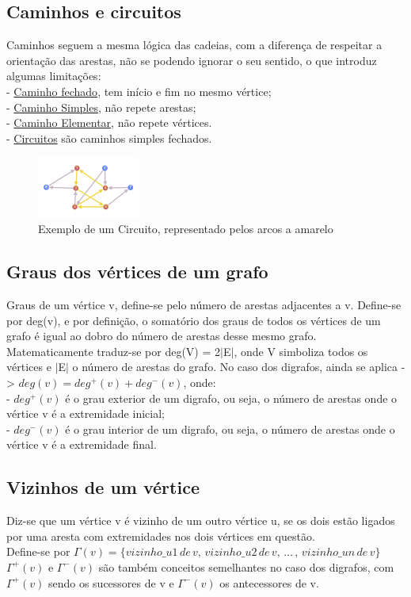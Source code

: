 \subsection{Caminhos e circuitos}
Caminhos seguem a mesma lógica das cadeias, com a diferença de respeitar a orientação das arestas, não 
se podendo ignorar o seu sentido, o que introduz algumas limitações:\\
\indent - \underline{Caminho fechado}, tem início e fim no mesmo vértice;\\
\indent - \underline{Caminho Simples}, não repete arestas;\\
\indent - \underline{Caminho Elementar}, não repete vértices.\\
\indent - \underline{Circuitos} são caminhos simples fechados.\\

\begin{figure}[h]
    \centering
    \includegraphics[width=0.3\textwidth]{imgs/Figura10}
    \caption{Exemplo de um Circuito, representado pelos arcos a amarelo
    \label{fig:imagem10}}
\end{figure}

\subsection{Graus dos vértices de um grafo}
Graus de um vértice v, define-se pelo número de arestas adjacentes a v. Define-se por deg(v), e por 
definição, o somatório dos graus de todos os vértices de um grafo é igual ao dobro do número de arestas 
desse mesmo grafo.\\
\indent Matematicamente traduz-se por  deg(V) = 2$\vert$E$\vert$, onde V simboliza todos os vértices e $\vert$E$\vert$ o número de 
arestas do grafo. No caso dos digrafos, ainda se aplica -> $deg(v) = deg^+(v) + deg^-(v)$, onde:\\
\indent - $deg^+(v)$ é o grau exterior de um digrafo, ou seja, o número de arestas onde o vértice v é a extremidade 
inicial;\\
\indent - $deg^-(v)$ é o grau interior de um digrafo, ou seja, o número de arestas onde o vértice v é a extremidade 
final.

\subsection{ Vizinhos de um vértice}
Diz-se que um vértice v é vizinho de um outro vértice u, se os dois estão ligados por uma aresta com 
extremidades nos dois vértices em questão.\\
\indent Define-se por $\Gamma(v)= \{ vizinho\_u1\,de\,v,\,vizinho\_u2\,de\,v,\,…\,,\,vizinho\_un\,de\,v \}$\\

$\Gamma^+(v)$ e $\Gamma^-(v)$ são também conceitos semelhantes no caso dos digrafos, com $\Gamma^+(v)$ sendo os sucessores de v e $\Gamma^-(v)$ os antecessores de v.
